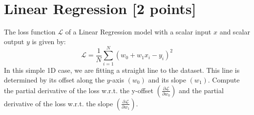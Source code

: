 %

\renewcommand\thesection{\arabic{section}}
\renewcommand\thesubsection{\thesection.\arabic{subsection}}

\section{Linear Regression [2 points]}
The loss function $\mathcal{L}$ of a Linear Regression model with a scalar input $x$ and scalar output $y$ is given by:
\begin{equation}
    \mathcal{L} = \frac{1}{N} \sum_{i=1}^{N} (w_0 + w_1x_i - y_i)^2
\end{equation}
In this simple 1D case, we are fitting a straight line to the dataset. This line is determined by its 
offset along the $y$-axis $\left(w_0\right)$ and its slope $\left(w_1\right)$. Compute the partial derivative of the loss w.r.t. the y-offset $\left(\frac{\partial \mathcal{L}}{\partial w_0}\right)$ and the partial derivative of the loss w.r.t. the slope $\left(\frac{\partial \mathcal{L}}{\partial w_1}\right)$.

